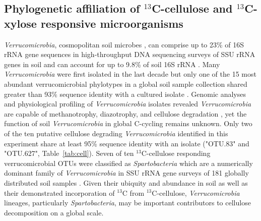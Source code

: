 \subsection{Phylogenetic affiliation of $^{13}$C-cellulose and
    $^{13}$C-xylose responsive microorganisms}
\textit{Verrucomicrobia}, cosmopolitan soil microbes
\citep{Bergmann_2011}, can comprise up to 23\% of 16S rRNA gene sequences in
high-throughput DNA sequencing surveys of SSU rRNA genes in soil
\citep{Bergmann_2011} and can account for up to 9.8\% of
soil 16S rRNA \citep{Buckley_2001}. Many \textit{Verrucomicrobia} were first
isolated in the last decade \cite{Wertz_2011} but only one of the 15 most
abundant verrucomicrobial phylotypes in a global soil sample collection shared
greater than 93\% sequence identity with a cultured isolate
\citep{Bergmann_2011}. Genomic analyses and physiological profiling of
\textit{Verrucomicrobia} isolates revealed \textit{Verrucomicrobia} are capable
of methanotrophy, diazotrophy, and cellulose degradation \citep{Otsuka_2012,
Wertz_2011}, yet the function of soil \textit{Verrucomicrobia} in global C-cycling
remains unknown. Only two of the ten putative cellulose degrading
\textit{Verrucomicrobia} identified in this experiment share at least 95\%
sequence identity with an isolate ("OTU.83" and "OTU.627",
Table~\ref{tab:cell}). Seven of ten $^{13}$C-cellulose responding
verrucomicrobial OTUs were classified as \textit{Spartobacteria} which are
a numerically dominant family of \textit{Verrucomicrobia} in SSU rRNA gene
surveys of 181 globally distributed soil samples \citep{Bergmann_2011}. Given
their ubiquity and abundance in soil as well as their demonstrated
incorporation of $^{13}$C from $^{13}$C-cellulose, \textit{Verrucomicrobia}
lineages, particularly \textit{Spartobacteria}, may be important contributors
to cellulose decomposition on a global scale.

